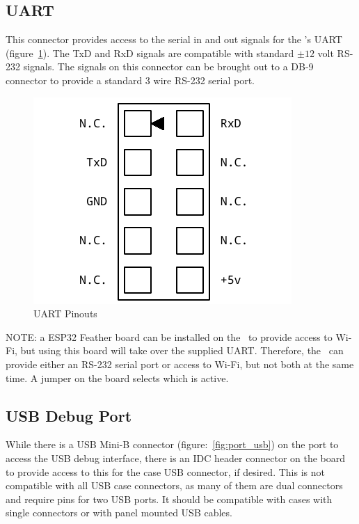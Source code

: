 \subsection*{UART}

This connector provides access to the serial in and out signals for the \jr's UART (figure~\ref{fig:port_uart}). The TxD and RxD signals are compatible with standard $\pm 12$ volt RS-232 signals. The signals on this connector can be brought out to a DB-9 connector to provide a standard 3 wire RS-232 serial port.

\begin{figure}[ht]
    \begin{center}
        \includegraphics[scale=0.65]{images/f256_port_uart.pdf}
    \end{center}
    \caption{UART Pinouts}
    \label{fig:port_uart}
\end{figure}

NOTE: a ESP32 Feather board can be installed on the \jr\ to provide access to Wi-Fi, but using this board will take over the supplied UART. Therefore, the \jr\ can provide either an RS-232 serial port or access to Wi-Fi, but not both at the same time. A jumper on the board selects which is active.

\subsection*{USB Debug Port}

While there is a USB Mini-B connector (figure:~\ref{fig:port_usb}) on the port to access the USB debug interface, there is an IDC header connector on the board to provide access to this for the case USB connector, if desired. This is not compatible with all USB case connectors, as many of them are dual connectors and require pins for two USB ports. It should be compatible with cases with single connectors or with panel mounted USB cables.

